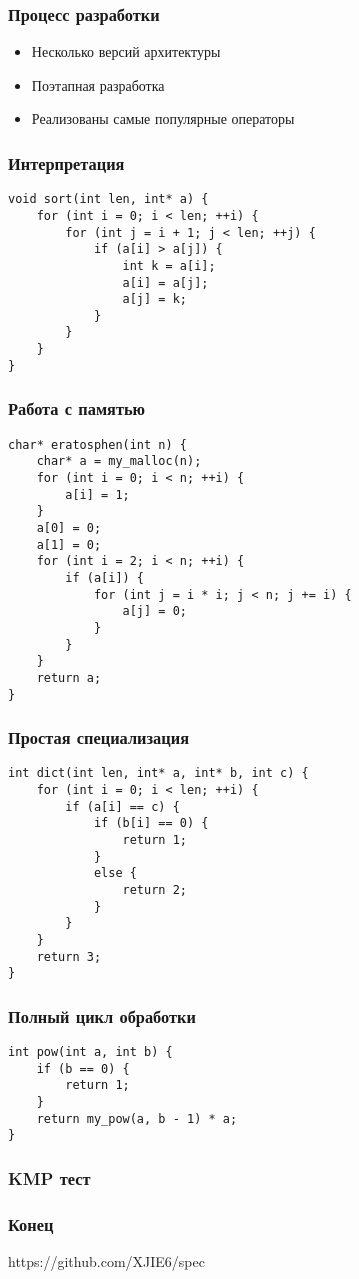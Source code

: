 \documentclass{beamer}
\begin{document}
\begin{frame}\frametitle{Процесс разработки}
\begin{itemize}
    \item<2->  {Несколько версий архитектуры}
    \item<3-> {Поэтапная разработка}
    \item<4-> {Реализованы самые популярные операторы}
\end{itemize}
\end{frame}

\lstset{language=C}
\begin{frame}[fragile]\frametitle{Интерпретация}
\begin{lstlisting}
void sort(int len, int* a) {
    for (int i = 0; i < len; ++i) {
        for (int j = i + 1; j < len; ++j) {
            if (a[i] > a[j]) {
                int k = a[i];
                a[i] = a[j];
                a[j] = k;
            }
        }
    }
}
\end{lstlisting}
\end{frame}

\lstset{language=C}
\begin{frame}[fragile]\frametitle{Работа с памятью}
\begin{lstlisting}
char* eratosphen(int n) {
    char* a = my_malloc(n);
    for (int i = 0; i < n; ++i) {
        a[i] = 1;
    }
    a[0] = 0;
    a[1] = 0;
    for (int i = 2; i < n; ++i) {
        if (a[i]) {
            for (int j = i * i; j < n; j += i) {
                a[j] = 0;
            }
        }
    }
    return a;
}
\end{lstlisting}
\end{frame}

\lstset{language=C}
\begin{frame}[fragile]\frametitle{Простая специализация}
\begin{lstlisting}
int dict(int len, int* a, int* b, int c) {
    for (int i = 0; i < len; ++i) {
        if (a[i] == c) {
            if (b[i] == 0) {
                return 1;
            }
            else {
                return 2;
            }
        }
    }
    return 3;
}
\end{lstlisting}
\end{frame}

\lstset{language=C}
\begin{frame}[fragile]\frametitle{Полный цикл обработки}
\begin{lstlisting}
int pow(int a, int b) {
    if (b == 0) {
        return 1;
    }
    return my_pow(a, b - 1) * a;
}
\end{lstlisting}
\end{frame}

\begin{frame}\frametitle{KMP тест}
\end{frame}

\begin{frame}\frametitle{Конец}
https://github.com/XJIE6/spec
\end{frame}
\end{document}
